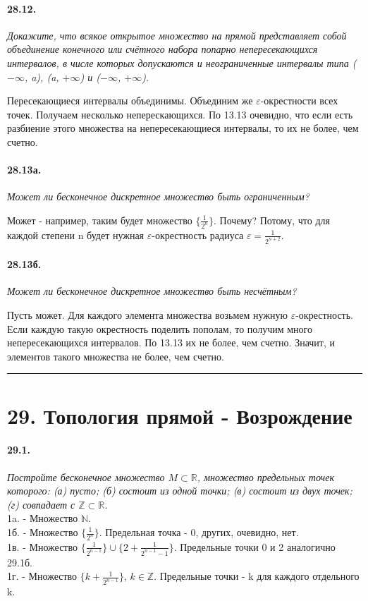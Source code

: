 \documentclass{book}
\begin{document}
\newpage

\paragraph{28.12.}
\textit{Докажите, что всякое открытое множество на прямой представляет собой объединение конечного или счётного набора попарно непересекающихся интервалов, в числе которых допускаются и неограниченные интервалы типа ($-\infty$, a), (a, $+\infty$) и ($-\infty$, $+\infty$).}

Пересекающиеся интервалы объединимы. Объединим же $\varepsilon$-окрестности всех точек. Получаем несколько неперескающихся. По 13.13 очевидно, что если есть разбиение этого множества на непересекающиеся интервалы, то их не более, чем счетно.


\paragraph{28.13а.}
\textit{Может ли бесконечное дискретное множество быть ограниченным?}

Может - например, таким будет множество $\{\frac{1}{2^n}\}$. Почему? Потому, что для каждой степени n будет нужная $\varepsilon$-окрестность радиуса $\varepsilon = \frac{1}{2^{n+2}}$.

\paragraph{28.13б.}
\textit{Может ли бесконечное дискретное множество быть несчётным?}

Пусть может. Для каждого элемента множества возьмем нужную $\varepsilon$-окрестность. Если каждую такую окрестность поделить пополам, то получим много непересекающихся интервалов. По 13.13 их не более, чем счетно. Значит, и элементов такого множества не более, чем счетно.

\medskip \hrule \medskip

\section*{29. Топология прямой - Возрождение}


\paragraph{29.1.}
\textit{Постройте бесконечное множество $M \subset \mathbb{R}$, множество предельных точек которого: (а) пусто; (б) состоит из одной точки; (в) состоит из двух точек; (г) совпадает с $\mathbb{Z} \subset  \mathbb{R}$.} \\
1a. -  Множество $\mathbb{N}$. \\
	1б. - Множество $\{\frac{1}{2^n}\}$. Предельная точка - 0, других, очевидно, нет. \\
	1в. - Множество $\{\frac{1}{2^{n-1}}\} \cup  \{2 + \frac{1}{2^{n-1}-1}\}$. Предельные точки 0 и 2 аналогично 29.1б. \\
	1г. -  Множество $\{k + \frac{1}{2^{n-1}}\}$, $k \in \mathbb{Z}$. Предельные точки - k для каждого отдельного k.
	
\end{document}
